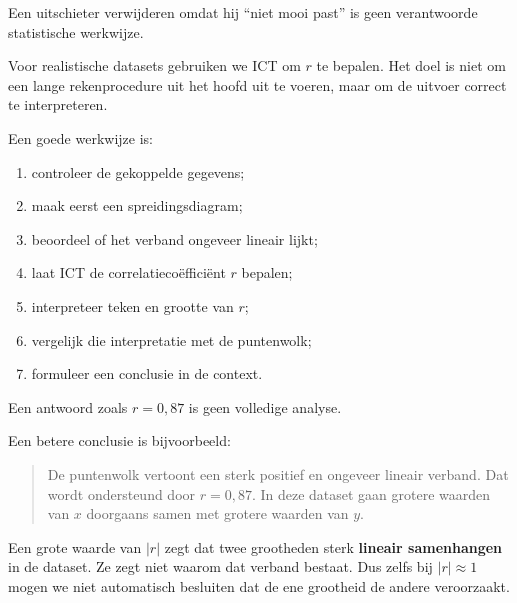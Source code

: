 \documentclass{ximera}
\begin{document}
\begin{opmerking}
Een uitschieter verwijderen omdat hij ``niet mooi past'' is geen
verantwoorde statistische werkwijze.
\end{opmerking}



Voor realistische datasets gebruiken we ICT om $r$ te bepalen. Het doel is niet om een lange rekenprocedure uit het hoofd uit te
voeren, maar om de uitvoer correct te interpreteren.

Een goede werkwijze is:

\begin{enumerate}
  \item controleer de gekoppelde gegevens;
  \item maak eerst een spreidingsdiagram;
  \item beoordeel of het verband ongeveer lineair lijkt;
  \item laat ICT de correlatiecoëfficiënt $r$ bepalen;
  \item interpreteer teken en grootte van $r$;
  \item vergelijk die interpretatie met de puntenwolk;
  \item formuleer een conclusie in de context.
\end{enumerate}

\begin{opmerking}
Een antwoord zoals
\(
r=0{,}87
\)
is geen volledige analyse.

Een betere conclusie is bijvoorbeeld:

\begin{quote}
De puntenwolk vertoont een sterk positief en ongeveer lineair verband.
Dat wordt ondersteund door $r=0{,}87$. In deze dataset gaan grotere
waarden van $x$ doorgaans samen met grotere waarden van $y$.
\end{quote}
\end{opmerking}



Een grote waarde van $|r|$ zegt dat twee grootheden sterk
\textbf{lineair samenhangen} in de dataset. Ze zegt niet waarom dat verband bestaat.
Dus zelfs bij
\(
|r|\approx 1
\)
mogen we niet automatisch besluiten dat de ene grootheid de andere
veroorzaakt.
\end{document}
